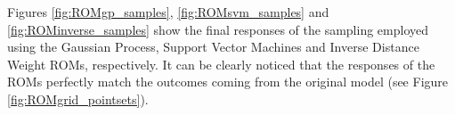 Figures \ref{fig:ROMgp_samples}, \ref{fig:ROMsvm_samples} and \ref{fig:ROMinverse_samples}  show the final responses  of the sampling employed using the Gaussian Process, Support Vector Machines and Inverse Distance Weight ROMs, respectively.
It can be clearly noticed that the responses of the ROMs perfectly match the outcomes coming from the original model (see Figure   \ref{fig:ROMgrid_pointsets}).








